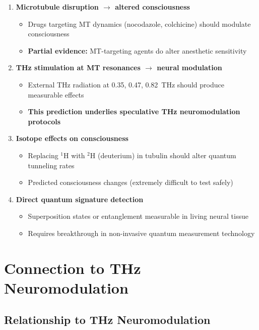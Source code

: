 \begin{enumerate}
\item \textbf{Microtubule disruption $\rightarrow$ altered consciousness}
  \begin{itemize}
  \item Drugs targeting MT dynamics (nocodazole, colchicine) should modulate consciousness
  \item \textbf{Partial evidence:} MT-targeting agents do alter anesthetic sensitivity
  \end{itemize}

\item \textbf{THz stimulation at MT resonances $\rightarrow$ neural modulation}
  \begin{itemize}
  \item External THz radiation at 0.35, 0.47, 0.82~THz should produce measurable effects
  \item \textbf{This prediction underlies speculative THz neuromodulation protocols}
  \end{itemize}

\item \textbf{Isotope effects on consciousness}
  \begin{itemize}
  \item Replacing $^1$H with $^2$H (deuterium) in tubulin should alter quantum tunneling rates
  \item Predicted consciousness changes (extremely difficult to test safely)
  \end{itemize}

\item \textbf{Direct quantum signature detection}
  \begin{itemize}
  \item Superposition states or entanglement measurable in living neural tissue
  \item Requires breakthrough in non-invasive quantum measurement technology
  \end{itemize}
\end{enumerate}

\section{Connection to THz Neuromodulation}

\subsection{Relationship to THz Neuromodulation}\label{relationship-to-thz-neuromodulation}


